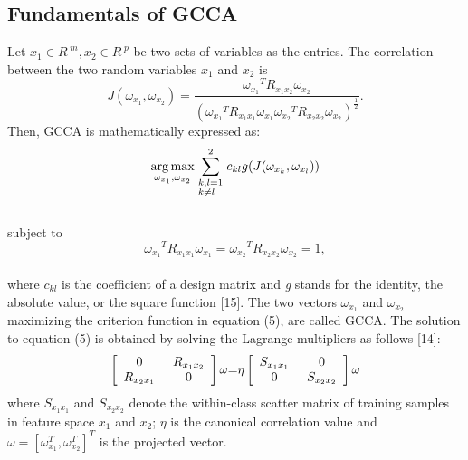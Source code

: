 \documentclass[journal]{IEEEtran}
\begin{document}
\subsection{Fundamentals of GCCA}
Let $ x_1 \in {R^{\;m}},x_2 \in {R^{\;p}} $ be two sets of variables as the entries. The correlation between the two random variables $x_1$ and $x_2$ is
\begin{equation}
J({\omega _{{x_1}}},{\omega _{{x_2}}}) = \frac{{{\omega _{{x_1}}}^T{R_{{{{x_1}}}{{{x_2}}}}}{\omega _{{x_2}}}}}{{{{({\omega _{{x_1}}}^T{R_{{{{x_1}}}{{{x_1}}}}}{\omega _{{x_1}}}{\omega _{{x_2}}}^T{R_{{{{x_2}}}{{{x_2}}}}}{\omega _{{x_2}}})}^{\frac{1}{2}}}}}.
\end{equation}
 Then, GCCA is mathematically expressed as:
 \begin{equation} \mathop {\arg \max }\limits_{{\omega _{x_1}},{\omega _{x_2}} }  \sum\limits_{\scriptstyle k,l = 1 \hfill \atop
  \scriptstyle {\rm{ }}k \ne l \hfill}^2 c_{kl} g(J({\omega _{{x_k}}},{\omega _{{x_l}}})) \end{equation}\\
  subject to \begin{equation}
{\omega _{{x_1}}}^T{R_{{x_1}{x_1}}}{\omega _{{x_1}}} = {\omega _{{x_2}}}^T{R_{{x_2}{x_2}}}{\omega _{{x_2}}} = 1,
 \end{equation}\\
 where $c_{kl}$ is the coefficient of a design matrix and \emph{g} stands for the identity, the absolute value, or the square function [15]. The two vectors $\omega _{{x_1}}$ and $\omega _{{x_2}}$ maximizing the criterion function in equation (5), are called GCCA. The solution to equation (5) is obtained by solving the Lagrange multipliers as follows [14]:
 \begin{equation}
 \left[ {\begin{array}{*{20}{c}}
   0  \\
   {{R_{{x_2}{x_1}}}}  \\
\end{array}} \right.\left. {\begin{array}{*{20}{c}}
   {{\rm{    }}{R_{{x_1}{x_2}}}}  \\
   {\rm{0}}  \\
\end{array}} \right]\omega {\rm{ = }}\eta \left[ {\begin{array}{*{20}{c}}
   {{S_{{x_1}{x_1}}}}  \\
   {\rm{0}}  \\
\end{array}} \right.\left. {\begin{array}{*{20}{c}}
   0  \\
   {{\rm{    }}{S_{{x_2}{x_2}}}}  \\
\end{array}} \right]\omega
\end{equation}
where ${S_{{x_1}{x_1}}}$ and ${S_{{x_2}{x_2}}}$ denote the within-class scatter matrix of training samples in feature space ${x_1}$ and ${x_2}$; $\eta$ is the canonical correlation value and $\omega  = {[{\omega _{x_1}^T},{\omega _{x_2}^T}]^T}$ is the projected vector.
\end{document}
